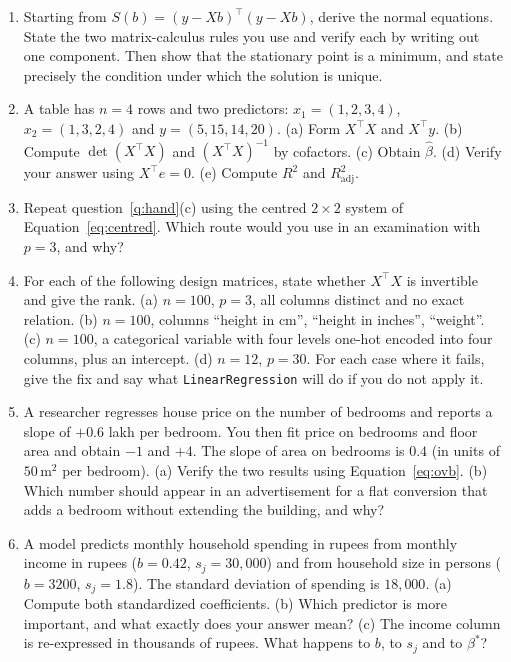 \documentclass[11pt]{article}
\newcommand{\Xt}{X^{\!\top}}
\begin{document}
\begin{enumerate}[leftmargin=*]
  \item\label{q:derive} Starting from $S(b) = (y - Xb)^{\!\top}(y - Xb)$,
    derive the normal equations. State the two matrix-calculus rules you use
    and verify each by writing out one component. Then show that the
    stationary point is a minimum, and state precisely the condition under
    which the solution is unique.

  \item\label{q:hand} A table has $n = 4$ rows and two predictors:
    $x_1 = (1, 2, 3, 4)$, $x_2 = (1, 3, 2, 4)$ and $y = (5, 15, 14, 20)$.
    (a) Form $\Xt X$ and $\Xt y$. (b) Compute $\det(\Xt X)$ and
    $(\Xt X)^{-1}$ by cofactors. (c) Obtain $\hat\beta$. (d) Verify your
    answer using $\Xt e = 0$. (e) Compute $R^2$ and $R^2_{\text{adj}}$.

  \item\label{q:centred} Repeat question~\ref{q:hand}(c) using the centred
    $2\times2$ system of Equation~\eqref{eq:centred}. Which route would you
    use in an examination with $p = 3$, and why?

  \item\label{q:rank} For each of the following design matrices, state
    whether $\Xt X$ is invertible and give the rank. (a) $n = 100$, $p = 3$,
    all columns distinct and no exact relation. (b) $n = 100$, columns
    ``height in cm'', ``height in inches'', ``weight''. (c) $n = 100$, a
    categorical variable with four levels one-hot encoded into four columns,
    plus an intercept. (d) $n = 12$, $p = 30$. For each case where it fails,
    give the fix and say what \texttt{LinearRegression} will do if you do not
    apply it.

  \item\label{q:ovb} A researcher regresses house price on the number of
    bedrooms and reports a slope of $+0.6$ lakh per bedroom. You then fit
    price on bedrooms and floor area and obtain $-1$ and $+4$. The slope of
    area on bedrooms is $0.4$ (in units of $50\,\mathrm{m}^2$ per bedroom).
    (a) Verify the two results using Equation~\eqref{eq:ovb}. (b) Which
    number should appear in an advertisement for a flat conversion that adds
    a bedroom without extending the building, and why?

  \item\label{q:std} A model predicts monthly household spending in rupees
    from monthly income in rupees ($b = 0.42$, $s_j = 30{,}000$) and from
    household size in persons ($b = 3200$, $s_j = 1.8$). The standard
    deviation of spending is $18{,}000$. (a) Compute both standardized
    coefficients. (b) Which predictor is more important, and what exactly
    does your answer mean? (c) The income column is re-expressed in thousands
    of rupees. What happens to $b$, to $s_j$ and to $\beta^*$?


\end{enumerate}
\end{document}
